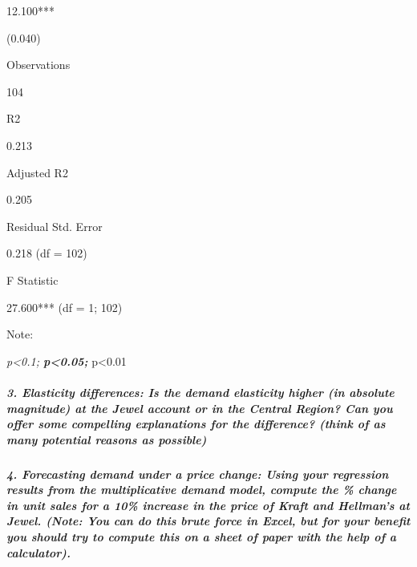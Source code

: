 \documentclass[]{article}
\let\oldsubparagraph\subparagraph
\renewcommand{\subparagraph}[1]{\oldsubparagraph{#1}\mbox{}}
\begin{document}
12.100***

(0.040)

Observations

104

R2

0.213

Adjusted R2

0.205

Residual Std. Error

0.218 (df = 102)

F Statistic

27.600*** (df = 1; 102)

Note:

\emph{p\textless{}0.1; \textbf{p\textless{}0.05; }}p\textless{}0.01

\hypertarget{elasticity-differences-is-the-demand-elasticity-higher-in-absolute-magnitude-at-the-jewel-account-or-in-the-central-region-can-you-offer-some-compelling-explanations-for-the-difference-think-of-as-many-potential-reasons-as-possible}{%
\subparagraph{3. Elasticity differences: Is the demand elasticity higher
(in absolute magnitude) at the Jewel account or in the Central Region?
Can you offer some compelling explanations for the difference? (think of
as many potential reasons as
possible)}\label{elasticity-differences-is-the-demand-elasticity-higher-in-absolute-magnitude-at-the-jewel-account-or-in-the-central-region-can-you-offer-some-compelling-explanations-for-the-difference-think-of-as-many-potential-reasons-as-possible}}

\hypertarget{forecasting-demand-under-a-price-change-using-your-regression-results-from-the-multiplicative-demand-model-compute-the-change-in-unit-sales-for-a-10-increase-in-the-price-of-kraft-and-hellmans-at-jewel.-note-you-can-do-this-brute-force-in-excel-but-for-your-benefit-you-should-try-to-compute-this-on-a-sheet-of-paper-with-the-help-of-a-calculator.}{%
\subparagraph{4. Forecasting demand under a price change: Using your
regression results from the multiplicative demand model, compute the \%
change in unit sales for a 10\% increase in the price of Kraft and
Hellman's at Jewel. (Note: You can do this brute force in Excel, but for
your benefit you should try to compute this on a sheet of paper with the
help of a
calculator).}\label{forecasting-demand-under-a-price-change-using-your-regression-results-from-the-multiplicative-demand-model-compute-the-change-in-unit-sales-for-a-10-increase-in-the-price-of-kraft-and-hellmans-at-jewel.-note-you-can-do-this-brute-force-in-excel-but-for-your-benefit-you-should-try-to-compute-this-on-a-sheet-of-paper-with-the-help-of-a-calculator.}}
\end{document}
